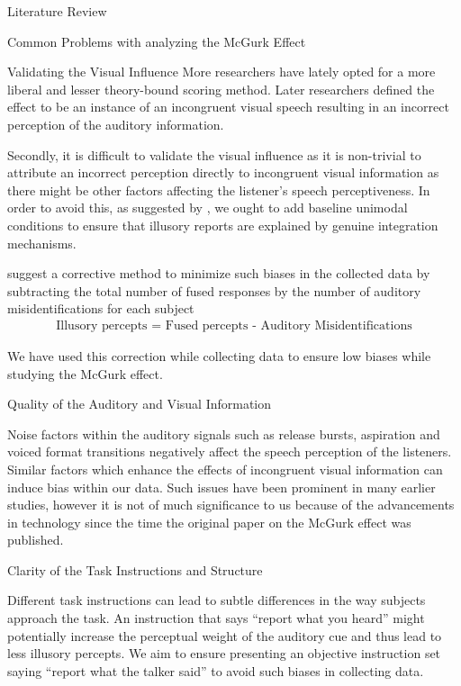 \documentclass{article}
\begin{document}
\begin{psection}{Literature Review}
\begin{psubsection}{Common Problems with analyzing the McGurk Effect}
\begin{pssubsection}{Validating the Visual Influence}
			More researchers have lately opted for a more liberal and lesser theory-bound scoring method. Later researchers defined the effect to be an instance of an incongruent visual speech resulting in an incorrect perception of the auditory information.

			Secondly, it is difficult to validate the visual influence as it is non-trivial to attribute an incorrect perception directly to incongruent visual information as there might be other factors affecting the listener's speech perceptiveness. In order to avoid this, as suggested by \cite{40-years}, we ought to add baseline unimodal conditions to ensure that illusory reports are explained by genuine integration mechanisms.

			 \cite{40-years} suggest a corrective method to minimize such biases in the collected data by subtracting the total number of fused responses by the number of auditory misidentifications for each subject \ie
			\begin{align*}
				\text{Illusory percepts = Fused percepts - Auditory Misidentifications}
			\end{align*}

			We have used this correction while collecting data to ensure low biases while studying the McGurk effect.

		\end{pssubsection}

		\begin{pssubsection}{Quality of the Auditory and Visual Information}

			Noise factors within the auditory signals such as release bursts, aspiration and voiced format transitions negatively affect the speech perception of the listeners. Similar factors which enhance the effects of incongruent visual information can induce bias within our data. Such issues have been prominent in many earlier studies, however it is not of much significance to us because of the advancements in technology since the time the original paper on the McGurk effect was published.

		\end{pssubsection}

		\begin{pssubsection}{Clarity of the Task Instructions and Structure}

			Different task instructions can lead to subtle differences in the way subjects approach the task. An instruction that says ``report what you heard'' might potentially increase the perceptual weight of the auditory cue and thus lead to less illusory percepts. We aim to ensure presenting an objective instruction set saying ``report what the talker said'' to avoid such biases in collecting data.


\end{pssubsection}
\end{psubsection}
\end{psection}
\end{document}
